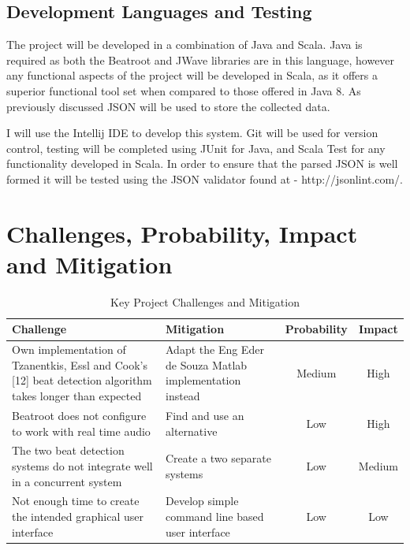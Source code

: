 \documentclass[a4paper, 11pt]{article}
\begin{document}
\subsection{Development Languages and Testing}
The project will be developed in a combination of Java and Scala. Java is required as both the Beatroot and JWave libraries are in this language, however any functional aspects of the project will be developed in Scala, as it offers a superior functional tool set when compared to those offered in Java 8. As previously discussed JSON will be used to store the collected data.

I will use the Intellij IDE to develop this system. Git will be used for version control, testing will be completed using JUnit for Java, and Scala Test for any functionality developed in Scala. In order to ensure that the parsed JSON is well formed it will be tested using the JSON validator found at - http://jsonlint.com/.

\section{Challenges, Probability, Impact and Mitigation}
\begin{table}[h]
\caption{Key Project Challenges and Mitigation} 
\centering
\begin{tabular}{|p{6cm}|p{6cm}|c|c|}
 \hline
\textbf{Challenge} & \textbf{Mitigation} & \textbf{Probability} & \textbf{Impact}\\ [0.5ex]
\hline 
Own implementation of Tzanentkis, Essl and Cook's [12] beat detection algorithm takes longer than expected & Adapt the Eng Eder de Souza Matlab implementation instead & Medium & High\\
\hline
Beatroot does not configure to work with real time audio & Find and use an alternative & Low & High\\ 
\hline
The two beat detection systems do not integrate well in a concurrent system & Create a two separate systems & Low & Medium\\
\hline
Not enough time to create the intended graphical user interface & Develop simple command line based user interface & Low & Low\\
\hline
\end{tabular}
\end{table}

\clearpage
\maketitle{} 
\end{document}
